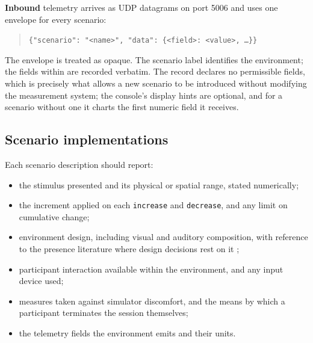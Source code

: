\textbf{Inbound} telemetry arrives as UDP datagrams on port 5006
and uses one envelope for every scenario:

\begin{quote}\texttt{\{"scenario": "<name>", "data": \{<field>: <value>, \dots\}\}}\end{quote}

The envelope is treated as opaque. The scenario label identifies
the environment; the fields within are recorded verbatim. The
record declares no permissible fields, which is precisely what
allows a new scenario to be introduced without modifying the
measurement system; the console's display hints are optional, and
for a scenario without one it charts the first numeric field it
receives.

\subsection{Scenario implementations}
\label{sec:unity-placeholder}

\noindent
{}

\vspace{6pt}
\noindent
Each scenario description should report:

\begin{itemize}
    \item the stimulus presented and its physical or spatial
    range, stated numerically;
    \item the increment applied on each \texttt{increase} and
    \texttt{decrease}, and any limit on cumulative change;
    \item environment design, including visual and auditory
    composition, with reference to the presence literature where
    design decisions rest on it
    \citep{slater2009, diemer2015, bailenson2003};
    \item participant interaction available within the
    environment, and any input device used;
    \item measures taken against simulator discomfort, and the
    means by which a participant terminates the session
    themselves;
    \item the telemetry fields the environment emits and their
    units.
\end{itemize}

